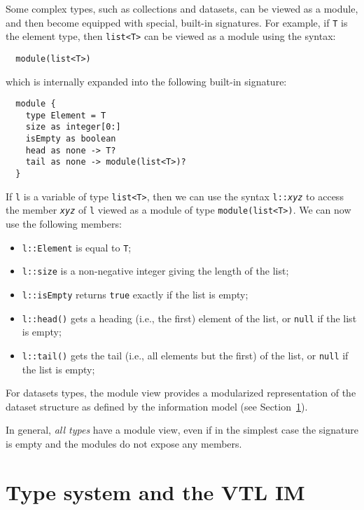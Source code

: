 \documentclass[droidmono,libertine,twoside,user,unofficial]{ecarticle}
\begin{document}
Some complex types, such as collections and datasets, can be viewed as
a module, and then become equipped with special, built-in signatures.
For example, if \texttt{T} is the element type, then \texttt{list<T>}
can be viewed as a module using the syntax:
\begin{lstlisting}
  module(list<T>)
\end{lstlisting}
which is internally expanded into the following built-in signature:
\begin{lstlisting}
  module {
    type Element = T
    size as integer[0:]
    isEmpty as boolean
    head as none -> T?
    tail as none -> module(list<T>)?
  }
\end{lstlisting}

If \texttt{l} is a variable of type \texttt{list<T>}, then we can use
the syntax \texttt{l::\emph{xyz}} to access the member
\texttt{\emph{xyz}} of \texttt{l} viewed as a module of type
\texttt{module(list<T>)}.  We can now use the following members:
\begin{itemize}
\item \texttt{l::Element} is equal to \texttt{T};
\item \texttt{l::size} is a non-negative integer giving the length of
  the list;
\item \texttt{l::isEmpty} returns \texttt{true} exactly if the list
  is empty;
\item \texttt{l::head()} gets a heading (i.e., the first) element of
  the list, or \texttt{null} if the list is empty;
\item \texttt{l::tail()} gets the tail (i.e., all elements but the
  first) of the list, or \texttt{null} if the list is empty;
\end{itemize}

For datasets types, the module view provides a modularized
representation of the dataset structure as defined by the information
model (see Section~\ref{sec:module-system-vtl}).

In general, \emph{all types} have a module view, even if in the
simplest case the signature is empty and the modules do not expose any
members.


\section{Type system and the VTL IM}
\label{sec:module-system-vtl}
\end{document}
